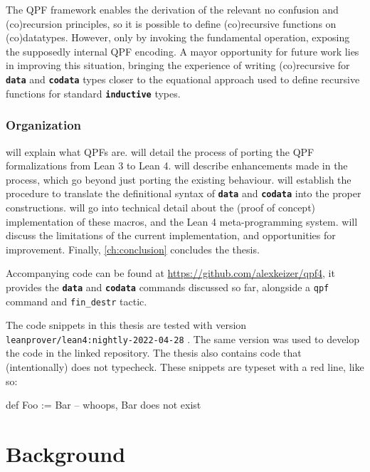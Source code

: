 \documentclass[titlepage]{report}
\newcommand\lean[1]{{%
\def\leanmode{1}%
\small \texttt{#1}%
\undef\leanmode%
}}
\newcommand\keyword[1]{{\color{keywordcolor} \textbf{\lean{#1}}}}
\newcommand\inductive{{\keyword{inductive}}}
\newcommand\data{\keyword{data}}
\newcommand\codata{\keyword{codata}}
\begin{document}
The QPF framework enables the derivation of the relevant no confusion and (co)recursion principles, so it is possible to define (co)recursive functions on (co)datatypes.
However, only by invoking the fundamental operation, exposing the supposedly internal QPF encoding. 
A mayor opportunity for future work lies in improving this situation, bringing the experience of writing (co)recursive for \data{} and \codata{} types closer to the equational approach used to define recursive functions for standard \inductive{} types.


\subsection*{Organization}
 will explain what QPFs are.
 will detail the process of porting the QPF formalizations from Lean 3 to Lean 4.
 will describe enhancements made in the process, which go beyond just porting the existing behaviour.
 will establish the procedure to translate the definitional syntax of \data{} and \codata{} into the proper constructions.
 will go into technical detail about the (proof of concept)
implementation of these macros, and the Lean 4 meta-programming system.
 will discuss the limitations of the current implementation, and opportunities for improvement.
Finally, \cref{ch:conclusion} concludes the thesis.

Accompanying code can be found at \url{https://github.com/alexkeizer/qpf4}, it provides the \data{} and \codata{} commands discussed so far, alongside a \lean{qpf} command and \lean{fin\_destr} tactic.

The code snippets in this thesis are tested with version \lean{leanprover/lean4:nightly-2022-04-28}. The same version was used to develop the code in the linked repository.
The thesis also contains code that (intentionally) does not typecheck. These snippets are typeset with a red line, like so:
\begin{badleancode}

    def Foo := Bar -- whoops, Bar does not exist

\end{badleancode}









\chapter{Background}
\label{ch:background}
\end{document}
